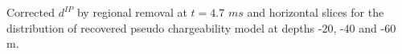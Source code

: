 \documentclass{segabs}
\begin{document}
{Corrected $d^{IP}$ by regional removal at $t=4.7$ $ms$ and horizontal slices for the distribution of recovered pseudo chargeability model at depths -20, -40 and -60 m.}




\twocolumn
\onecolumn
% 

\end{document}
